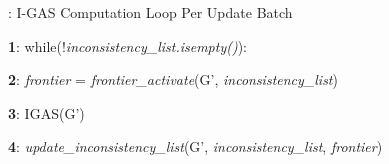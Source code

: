 

\begin{algorithm}[t]
\caption{: I-GAS Computation Loop Per Update Batch }
\label{alg:igas}

{\bf 1}:
while(!\textit{inconsistency\_list.isempty()}):

{\bf 2}:
\quad \textit{frontier} = \textit{frontier\_activate}(G', \textit{inconsistency\_list})

{\bf 3}:
  \quad IGAS(G')

{\bf 4}:
  \quad \textit{update\_inconsistency\_list}(G', \textit{inconsistency\_list}, \textit{frontier})
\label{algorithm:memcpy}
\end{algorithm}

